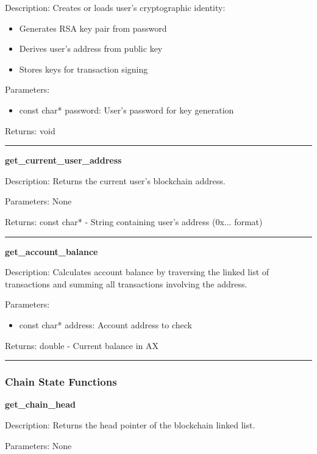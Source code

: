 \documentclass[12pt]{article}
\begin{document}
Description: Creates or loads user's cryptographic identity:
\begin{itemize}
\item Generates RSA key pair from password
\item Derives user's address from public key
\item Stores keys for transaction signing
\end{itemize}

Parameters:
\begin{itemize}
\item const char* password: User's password for key generation
\end{itemize}

Returns: void

\vspace{1em}
\hrule
\vspace{1em}

\textbf{get\_current\_user\_address}

Description: Returns the current user's blockchain address.

Parameters: None

Returns: const char* - String containing user's address (0x... format)

\vspace{1em}
\hrule
\vspace{1em}

\textbf{get\_account\_balance}

Description: Calculates account balance by traversing the linked list of transactions and summing all transactions involving the address.

Parameters:
\begin{itemize}
\item const char* address: Account address to check
\end{itemize}

Returns: double - Current balance in AX

\vspace{1em}
\hrule
\vspace{1em}

\subsubsection{Chain State Functions}
\textbf{get\_chain\_head}

Description: Returns the head pointer of the blockchain linked list.

Parameters: None
\end{document}
